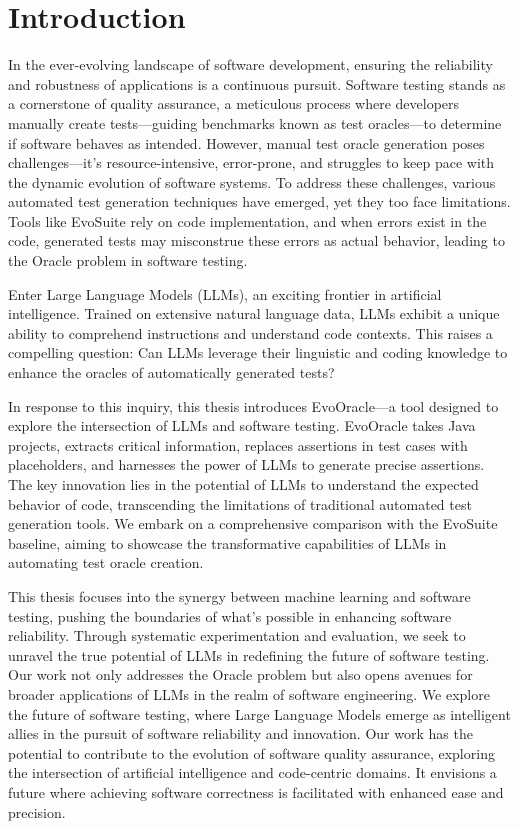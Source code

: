 \chapter{Introduction}
\label{cha:introduction}
\vspace{0.4 cm}

In the ever-evolving landscape of software development, ensuring the reliability and robustness of applications is a continuous pursuit. Software testing stands as a cornerstone of quality assurance, a meticulous process where developers manually create tests—guiding benchmarks known as test oracles—to determine if software behaves as intended. However, manual test oracle generation poses challenges\cite{6963470}—it's resource-intensive, error-prone, and struggles to keep pace with the dynamic evolution of software systems. To address these challenges, various automated test generation techniques\cite{6915770} have emerged, yet they too face limitations. Tools like EvoSuite\cite{noauthor_evosuite_nodate} rely on code implementation, and when errors exist in the code, generated tests may misconstrue these errors as actual behavior, leading to the Oracle problem in software testing.

Enter Large Language Models (LLMs)\cite{petroni_language_2019}, an exciting frontier in artificial intelligence. Trained on extensive natural language data, LLMs exhibit a unique ability to comprehend instructions and understand code contexts. This raises a compelling question: Can LLMs leverage their linguistic and coding knowledge to enhance the oracles of automatically generated tests?

In response to this inquiry, this thesis introduces EvoOracle—a tool designed to explore the intersection of LLMs and software testing. EvoOracle takes Java projects, extracts critical information, replaces assertions in test cases with placeholders, and harnesses the power of LLMs to generate precise assertions. The key innovation lies in the potential of LLMs to understand the expected behavior of code, transcending the limitations of traditional automated test generation tools. We embark on a comprehensive comparison with the EvoSuite baseline, aiming to showcase the transformative capabilities of LLMs in automating test oracle creation.

This thesis focuses into the synergy between machine learning and software testing, pushing the boundaries of what's possible in enhancing software reliability. Through systematic experimentation and evaluation, we seek to unravel the true potential of LLMs in redefining the future of software testing. Our work not only addresses the Oracle problem but also opens avenues for broader applications of LLMs in the realm of software engineering. We explore the future of software testing, where Large Language Models emerge as intelligent allies in the pursuit of software reliability and innovation. Our work has the potential to contribute to the evolution of software quality assurance, exploring the intersection of artificial intelligence and code-centric domains. It envisions a future where achieving software correctness is facilitated with enhanced ease and precision.

